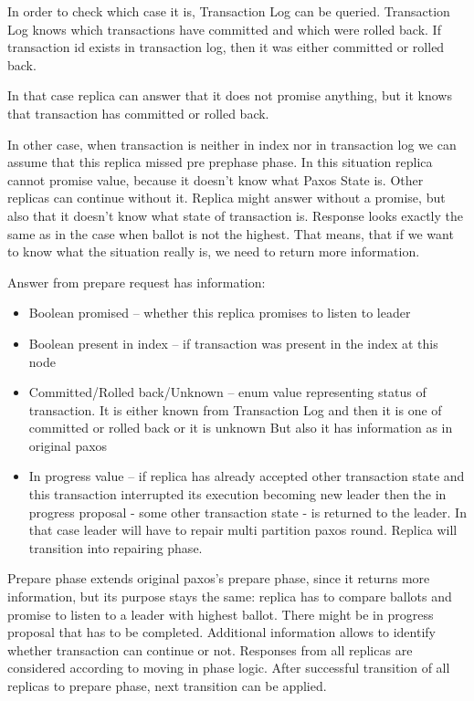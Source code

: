 In order to check which case it is, Transaction Log can be queried. Transaction Log knows which transactions have committed and which were rolled back. If transaction id exists in transaction log, then it was either committed or rolled back.


In that case replica can answer that it does not promise anything, but it knows that transaction has committed or rolled back.


In other case, when transaction is neither in index nor in transaction log we can assume that this replica missed pre prephase phase. In this situation replica cannot promise value, because it doesn’t know what Paxos State is. Other replicas can continue without it. Replica might answer without a promise, but also that it doesn’t know what state of transaction is. Response looks exactly the same as in the case when ballot is not the highest. That means, that if we want to know what the situation really is, we need to return more information.


Answer from prepare request has information:
\begin{itemize}
\item Boolean promised -- whether this replica promises to listen to leader
\item Boolean present in index -- if transaction was present in the index at this node
\item Committed/Rolled back/Unknown -- enum value representing status of transaction. It is either known from Transaction Log and then it is one of committed or rolled back or it is unknown
But also it has information as in original paxos
\item In progress value -- if replica has already accepted other transaction state and this transaction interrupted its execution becoming new leader then the in progress proposal - some other transaction state - is returned to the leader. In that case leader will have to repair multi partition paxos round. Replica will transition into repairing phase.
\end{itemize}


Prepare phase extends original paxos’s prepare phase, since it returns more information, but its purpose stays the same: replica has to compare ballots and promise to listen to a leader with highest ballot. 
There might be in progress proposal that has to be completed. Additional information allows to identify whether transaction can continue or not. Responses from all replicas are considered according to moving in phase logic.
After successful transition of all replicas to prepare phase, next transition can be applied.


